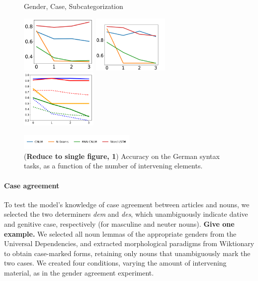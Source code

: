 \begin{figure}
Gender, Case, Subcategorization

\includegraphics[width=0.33\textwidth]{figures/german-gender-total.pdf}
\includegraphics[width=0.33\textwidth]{figures/german-case-total.pdf}
\includegraphics[width=0.33\textwidth]{figures/german-prep-with-control.pdf}

\centering\includegraphics[width=0.5\textwidth]{figures/german-legend.pdf}
\caption{(\textbf{Reduce to single figure, 1}) Accuracy on the German syntax tasks, as a function of the number of intervening elements.}\label{fig:german-syntax}
\end{figure}


\paragraph{Case agreement}
To test the model's knowledge of case agreement between articles and
nouns, we selected the two determiners \emph{dem} and \emph{des},
which unambiguously indicate dative and genitive case, respectively
(for masculine and neuter nouns). \textbf{Give one example.}  We selected all noun lemmas of the
appropriate genders from the Universal Dependencies, and extracted
morphological paradigms from Wiktionary to obtain case-marked forms,
retaining only nouns that unambiguously mark the two cases.  We created
four conditions, varying the amount of intervening material, as in the
gender agreement experiment.

